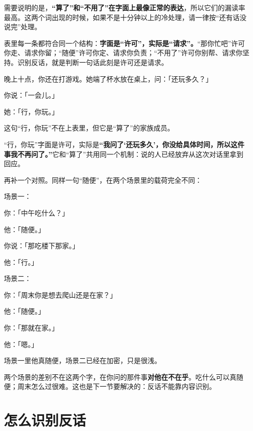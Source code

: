 需要说明的是，\textbf{“算了”和“不用了”在字面上最像正常的表达}，所以它们的漏读率最高。这两个词出现的时候，如果不是十分钟以上的冷处理，请一律按“还有话没说完”处理。

表里每一条都符合同一个结构：\textbf{字面是“许可”，实际是“请求”。}“那你忙吧”许可你走、请求你留；“随便”许可你定、请求你负责；“不用了”许可你别帮、请求你坚持。识别反话，就是判断一句话此刻是许可还是请求。

\par
\begin{mdquote}
晚上十点，你还在打游戏。她端了杯水放在桌上，问：「还玩多久？」\par
你说：「一会儿。」\par
她：「行，你玩。」\par
\vspace{0.3\baselineskip}
这句“行，你玩”不在上表里，但它是“算了”的家族成员。
\end{mdquote}

“行，你玩”字面是许可，实际是\textbf{“我问了‘还玩多久’，你没给具体时间，所以这件事我不再问了。”}它和“算了”共用同一个机制：说的人已经放弃从这次对话里拿到回应。

再补一个对照。同样一句“随便”，在两个场景里的载荷完全不同：

\begin{mdquote}
场景一：\par
你：「中午吃什么？」\par
他：「随便。」\par
你说：「那吃楼下那家。」\par
他：「行。」\par
\vspace{0.5\baselineskip}
场景二：\par
你：「周末你是想去爬山还是在家？」\par
他：「随便。」\par
你：「那就在家。」\par
他：「嗯。」\par
\vspace{0.3\baselineskip}
场景一里他真随便，场景二已经在加密，只是很浅。
\end{mdquote}

两个场景的差别不在这两个字，在你问的那件事\textbf{对他在不在乎}。吃什么可以真随便；周末怎么过很难。这也是下一节要解决的：反话不能靠内容识别。

\section{怎么识别反话}

